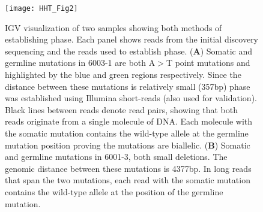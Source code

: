 \begin{figure}[tbp!]
\begin{center}
\texttt{[image: HHT\_Fig2]}
\end{center}

\caption[Establishing Phase of Germline and Somatic Mutations]{IGV visualization of two samples showing both methods of establishing phase. Each panel shows reads from the initial discovery sequencing and the reads used to establish phase. (\textbf{A}) Somatic and germline mutations in 6003-1 are both A$>$T point mutations and highlighted by the blue and green regions respectively. Since the distance between these mutations is relatively small (357bp) phase was established using Illumina short-reads (also used for validation). Black lines between reads denote read pairs, showing that both reads originate from a single molecule of DNA. Each molecule with the somatic mutation contains the wild-type allele at the germline mutation position proving the mutations are biallelic. (\textbf{B}) Somatic and germline mutations in 6001-3, both small deletions. The genomic distance between these mutations is 4377bp. In long reads that span the two mutations, each read with the somatic mutation contains the wild-type allele at the position of the germline mutation.}

\label{HHT_Figure_2}
\end{figure}

